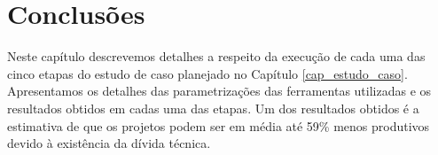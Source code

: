 \normalsize

\section{Conclusões}

Neste capítulo descrevemos detalhes a respeito da execução  de cada uma das cinco etapas do estudo de caso planejado no Capítulo \ref{cap_estudo_caso}. Apresentamos os detalhes das parametrizações das ferramentas utilizadas e os resultados obtidos em cadas uma das etapas.   Um dos resultados obtidos é a estimativa de que os projetos podem ser em média até 59\% menos produtivos devido à existência da dívida técnica. 

